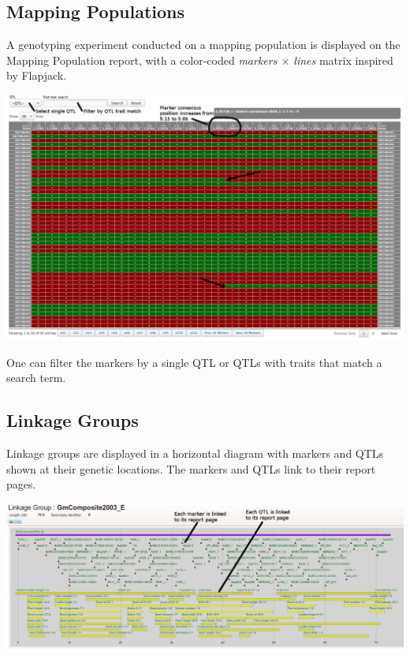 \documentclass[]{pagposter}
\newlength{\figwidth}
\begin{document}
\begin{multicols*}{3}
  \subsection*{Mapping Populations}

  A genotyping experiment conducted on a mapping population is displayed on the Mapping Population report, with a color-coded \textit{markers $\times$ lines} matrix inspired by Flapjack.

  \begin{center}
    \includegraphics[width=\figwidth]{genotype-matrix.png} %
  \end{center}

  One can filter the markers by a single QTL or QTLs with traits that match a search term.

  \subsection*{Linkage Groups}

  Linkage groups are displayed in a horizontal diagram with markers and QTLs shown at their genetic locations. The markers and QTLs link to their report pages.

  \begin{center}
    \includegraphics[width=\figwidth]{linkage-group-diagram.png} %
  \end{center}
  

\end{multicols*}
\end{document}
